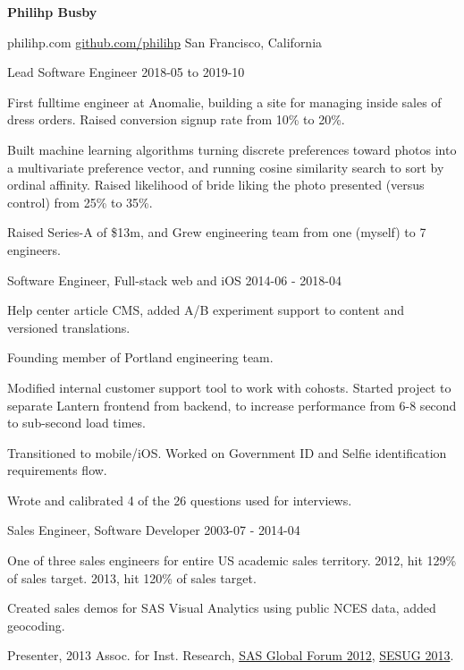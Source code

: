 \documentclass[11pt,english]{article}
\begin{document}
\centerline{{\Huge \bf Philihp Busby}}
\bigskip

        {philihp.com}
        {\href{https://github.com/philihp}{github.com/philihp}}
        {San Francisco, California}


\begin{description}
\squish

           {Lead Software Engineer}
           {2018-05 to 2019-10}
           
First fulltime engineer at Anomalie, building a site for managing inside sales of dress orders. Raised conversion signup rate from 10\% to 20\%.

Built machine learning algorithms turning discrete preferences toward photos into a multivariate preference vector, and running cosine similarity search to sort by ordinal affinity. Raised likelihood of bride liking the photo presented (versus control) from 25\% to 35\%.

Raised Series-A of \$13m, and Grew engineering team from one (myself) to 7 engineers.

           {Software Engineer, Full-stack web and iOS}
           {2014-06 - 2018-04}

Help center article CMS, added A/B experiment support to content and versioned translations.

Founding member of Portland engineering team.

Modified internal customer support tool to work with cohosts. Started project to separate Lantern frontend from backend, to increase performance from 6-8 second to sub-second load times.

Transitioned to mobile/iOS. Worked on Government ID and Selfie identification requirements flow.

Wrote and calibrated 4 of the 26 questions used for interviews.

           {Sales Engineer, Software Developer}
           {2003-07 - 2014-04}

One of three sales engineers for entire US academic sales territory. 2012, hit 129\% of sales target. 2013, hit 120\% of sales target.

Created sales demos for SAS Visual Analytics using public NCES data, added geocoding.

Presenter, 2013 Assoc. for Inst. Research, \href{http://support.sas.com/resources/papers/proceedings12/075-2012.pdf}{SAS Global Forum 2012}, \href{http://www.sesug.org/SESUG2013/abstract.html#CC-02}{SESUG 2013}.


\end{description}
\end{document}

